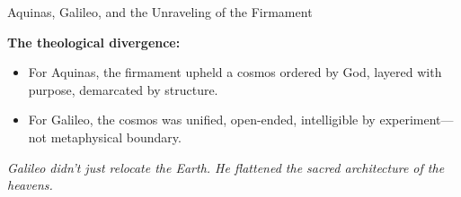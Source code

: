 \begin{HistoricalSidebar}{Aquinas, Galileo, and the Unraveling of the Firmament}
    \medskip
    
    \textbf{The theological divergence:}

    \medskip
    
    \begin{itemize}
      \item For Aquinas, the firmament upheld a cosmos ordered by God, layered with purpose, demarcated by structure.
      \item For Galileo, the cosmos was unified, open-ended, intelligible by experiment—not metaphysical boundary.
    \end{itemize}
    
    \begin{center}
    \emph{Galileo didn’t just relocate the Earth. He flattened the sacred architecture of the heavens.}
    \end{center}
    
\end{HistoricalSidebar}
    

